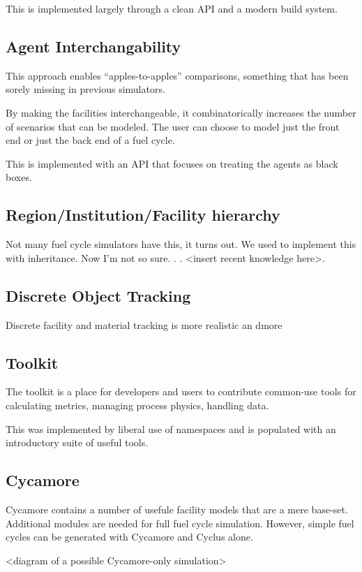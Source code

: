 This is implemented largely through a clean API and a modern build system.

\subsection{Agent Interchangability}

This approach enables ``apples-to-apples'' comparisons, something that has been 
sorely missing in previous simulators.

By making the facilities interchangeable, it combinatorically increases the 
number of scenarios that can be modeled. The user can choose to model just the 
front end or just the back end of a fuel cycle. 

This is implemented with an API that focuses on treating the agents as black 
boxes. 

\subsection{Region/Institution/Facility hierarchy}

Not many fuel cycle simulators have this, it turns out. We used to implement 
this with inheritance. Now I'm not so sure. . . <insert recent knowledge here>.

\subsection{Discrete Object Tracking}

Discrete facility and material tracking is more realistic an dmore 

\subsection{Toolkit}

The toolkit is a place for developers and users to contribute common-use tools 
for calculating metrics, managing process physics, handling data.

This was implemented by liberal use of namespaces  and is populated with an 
introductory suite of useful tools. 


\subsection{Cycamore}

Cycamore contains a number of usefule facility models that are a mere base-set. 
Additional modules are needed for full fuel cycle simulation. However, simple 
fuel cycles can be generated with Cycamore and Cyclus alone. 

<diagram of a possible Cycamore-only simulation>
